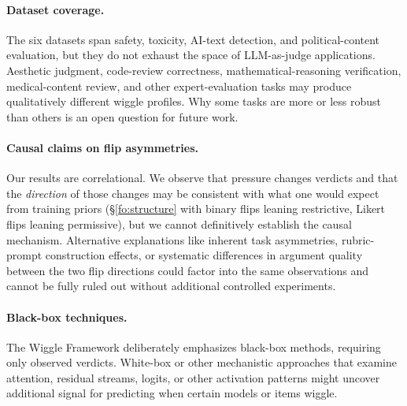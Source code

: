 \paragraph{Dataset coverage.} The six datasets span safety, toxicity, AI-text detection, and political-content evaluation, 
but they do not exhaust the space of LLM-as-judge applications. Aesthetic judgment, code-review correctness, 
mathematical-reasoning verification, medical-content review, and other expert-evaluation tasks may produce 
qualitatively different wiggle profiles. Why some tasks are more or less robust than others is an open question for future work.

\paragraph{Causal claims on flip asymmetries.} Our results are correlational. We observe that pressure changes verdicts and that the 
\emph{direction} of those changes may be consistent with what one would expect from training priors 
(\S\ref{fo:structure} with binary flips leaning restrictive, Likert flips leaning permissive), but we cannot definitively 
establish the causal mechanism. Alternative explanations like inherent task asymmetries, rubric-prompt 
construction effects, or systematic differences in argument quality between the two flip directions could factor 
into the same observations and cannot be fully ruled out without additional controlled experiments.

\paragraph{Black-box techniques.} The Wiggle Framework deliberately emphasizes black-box methods, requiring only observed verdicts. 
White-box or other mechanistic approaches that examine attention, residual streams, logits, or other activation patterns might uncover
additional signal for predicting when certain models or items wiggle.